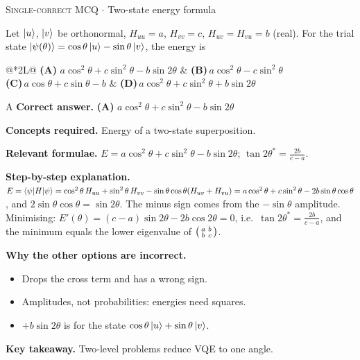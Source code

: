 \documentclass[11pt,a4paper]{article}
\newcommand{\optlabel}[1]{\textbf{(#1)}}
\newcommand{\correctlabel}[1]{\textcolor{okgreen}{\textbf{(#1)}\,\ding{51}}}
\newenvironment{qitem}[1]{\begin{list}{}{\setlength{\leftmargin}{3.3em}\setlength{\labelwidth}{3.1em}%
  \setlength{\labelsep}{0.2em}\setlength{\topsep}{3pt}\setlength{\parsep}{3pt}}\item[\textbf{Q.#1}\hfill]}{\end{list}}
\newcommand{\qsep}{\par\vspace{2pt}{\color{black!15}\hrule}\vspace{4pt}}
\newcommand{\qmeta}[2]{{\footnotesize\color{black!60}\textsc{#1} \;$\cdot$\; #2}\par}
\begin{document}
\begin{qitem}{45}
\qmeta{Single-correct MCQ}{Two-state energy formula}
Let $\ket u$, $\ket v$ be orthonormal, $H_{uu} = a$, $H_{vv} = c$, $H_{uv} = H_{vu} = b$ (real). For the trial state $\ket{\psi(\theta)} = \cos\theta\ket u - \sin\theta\ket v$, the energy is
\par\smallskip\noindent\begin{tabularx}{\linewidth}{@{}*{2}{L}@{}}
\correctlabel{A}\,$a\cos^2\theta + c\sin^2\theta - b\sin2\theta$ & \optlabel{B}\,$a\cos^2\theta - c\sin^2\theta$ \\[3pt]
\optlabel{C}\,$a\cos\theta + c\sin\theta - b$ & \optlabel{D}\,$a\cos^2\theta + c\sin^2\theta + b\sin2\theta$
\end{tabularx}
\end{qitem}
\begin{solbox}{A}
\textbf{\color{brand}Correct answer.} \textcolor{okgreen}{\textbf{(A)}} $a\cos^2\theta + c\sin^2\theta - b\sin2\theta$

\textbf{\color{brand}Concepts required.} Energy of a two-state superposition.

\textbf{\color{brand}Relevant formulae.} $E = a\cos^2\theta + c\sin^2\theta - b\sin2\theta$; $\tan2\theta^* = \frac{2b}{c - a}$.

\textbf{\color{brand}Step-by-step explanation.} $E = \braket{\psi|H|\psi} = \cos^2\theta\,H_{uu} + \sin^2\theta\,H_{vv} - \sin\theta\cos\theta(H_{uv} + H_{vu}) = a\cos^2\theta + c\sin^2\theta - 2b\sin\theta\cos\theta$,
and $2\sin\theta\cos\theta = \sin2\theta$. The minus sign comes from the $-\sin\theta$ amplitude. Minimising: $E'(\theta) = (c - a)\sin2\theta - 2b\cos2\theta = 0$,
i.e.\ $\tan2\theta^* = \frac{2b}{c - a}$, and the minimum equals the lower eigenvalue of $\begin{psmallmatrix}a&b\\b&c\end{psmallmatrix}$.

\textbf{\color{brand}Why the other options are incorrect.}
\begin{itemize}[leftmargin=2.4em, itemsep=1pt, topsep=2pt]
\item[\textbf{(B)}] Drops the cross term and has a wrong sign.
\item[\textbf{(C)}] Amplitudes, not probabilities: energies need squares.
\item[\textbf{(D)}] $+b\sin2\theta$ is for the state $\cos\theta\ket u + \sin\theta\ket v$.
\end{itemize}
\textbf{\color{brand}Key takeaway.} Two-level problems reduce VQE to one angle.
\end{solbox}
\qsep
\end{document}
